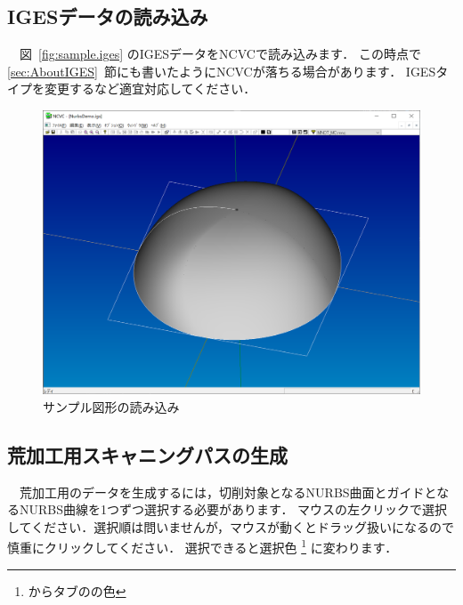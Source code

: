 
\subsection{IGESデータの読み込み}
　図~\ref{fig:sample.iges} のIGESデータをNCVCで読み込みます．
この時点で \ref{sec:AboutIGES}~節にも書いたようにNCVCが落ちる場合があります．
IGESタイプを変更するなど適宜対応してください．

\begin{figure}[H]
\centering
\includegraphics[scale=0.5]{No2/fig/fig21.png}
\caption{サンプル図形の読み込み}
\label{fig:ncvc21}
\end{figure}

\subsection{荒加工用スキャニングパスの生成}
　荒加工用のデータを生成するには，切削対象となるNURBS曲面とガイドとなるNURBS曲線を1つずつ選択する必要があります．
マウスの左クリックで選択してください．選択順は問いませんが，マウスが動くとドラッグ扱いになるので慎重にクリックしてください．
選択できると選択色
\footnote{からタブのの色}
に変わります．


